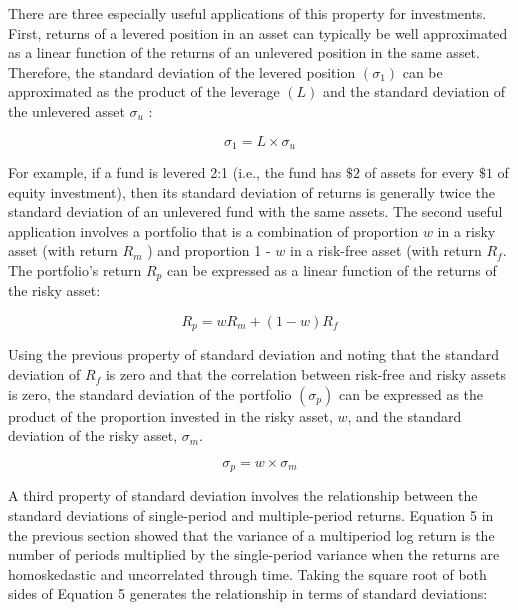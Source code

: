 \documentclass[11pt]{article}
\begin{document}
There are three especially useful applications of this property for investments. First, returns of a levered position in an asset can typically be well approximated as a linear function of the returns of an unlevered position in the same asset. Therefore, the standard deviation of the levered position $\left(\sigma_{1}\right)$ can be approximated as the product of the leverage $(L)$ and the standard deviation of the unlevered asset $\sigma_{u}$ :


\begin{equation*}
\sigma_{1}=L \times \sigma_{u} \tag{8}
\end{equation*}


For example, if a fund is levered 2:1 (i.e., the fund has $\$ 2$ of assets for every $\$ 1$ of equity investment), then its standard deviation of returns is generally twice the standard deviation of an unlevered fund with the same assets. The second useful application involves a portfolio that is a combination of proportion $w$ in a risky asset (with return $R_{m}$ ) and proportion 1 - $w$ in a risk-free asset (with return $R_{f}$. The portfolio's return $R_{p}$ can be expressed as a linear function of the returns of the risky asset:


\begin{equation*}
R_{p}=w R_{m}+(1-w) R_{f} \tag{9}
\end{equation*}


Using the previous property of standard deviation and noting that the standard deviation of $R_{f}$ is zero and that the correlation between risk-free and risky assets is zero, the standard deviation of the portfolio $\left(\sigma_{p}\right)$ can be expressed as the product of the proportion invested in the risky asset, $w$, and the standard deviation of the risky asset, $\sigma_{m}$.


\begin{equation*}
\sigma_{p}=w \times \sigma_{m} \tag{10}
\end{equation*}


A third property of standard deviation involves the relationship between the standard deviations of single-period and multiple-period returns. Equation 5 in the previous section showed that the variance of a multiperiod log return is the number of periods multiplied by the single-period variance when the returns are homoskedastic and uncorrelated through time. Taking the square root of both sides of Equation 5 generates the relationship in terms of standard deviations:
\end{document}
